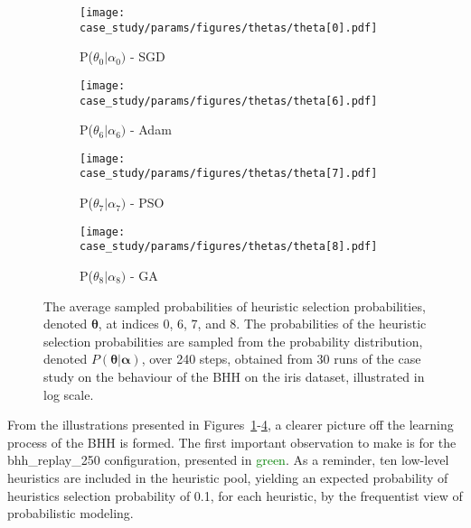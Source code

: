 \begin{figure}[htb]
	\begin{subfigure}{0.5\textwidth}
		\centering
		\texttt{[image: case\_study/params/figures/thetas/theta[0].pdf]}
		\caption{P($\theta_{0} \vert \alpha_{0})$ - \acs{SGD}}
		\label{fig:results:case_study:thetas:0}
	\end{subfigure}
	\begin{subfigure}{0.5\textwidth}
		\centering
		\texttt{[image: case\_study/params/figures/thetas/theta[6].pdf]}
		\caption{P($\theta_{6} \vert \alpha_{6})$ - \acs{Adam}}
		\label{fig:results:case_study:thetas:6}
	\end{subfigure}
	\par\bigskip
	\begin{subfigure}{0.5\textwidth}
		\centering
		\texttt{[image: case\_study/params/figures/thetas/theta[7].pdf]}
		\caption{P($\theta_{7} \vert \alpha_{7})$ - \acs{PSO}}
		\label{fig:results:case_study:thetas:7}
	\end{subfigure}
	\begin{subfigure}{0.5\textwidth}
		\centering
		\texttt{[image: case\_study/params/figures/thetas/theta[8].pdf]}
		\caption{P($\theta_{8} \vert \alpha_{8})$ - \acs{GA}}
		\label{fig:results:case_study:thetas:8}
	\end{subfigure}
	\par\bigskip
	\caption{The average sampled probabilities of heuristic selection probabilities, denoted $\boldsymbol{\theta}$, at indices 0, 6, 7, and 8. The probabilities of the heuristic selection probabilities are sampled from the probability distribution, denoted $P(\boldsymbol{\theta} \vert \boldsymbol{\alpha})$, over 240 steps, obtained from 30 runs of the case study on the behaviour of the \acs{BHH} on the iris dataset, illustrated in log scale.}
	\label{fig:results:case_study:thetas}
\end{figure}


From the illustrations presented in Figures~\ref{fig:results:case_study:thetas:0}-\ref{fig:results:case_study:thetas:8}, a clearer picture off the learning process of the \acs{BHH} is formed. The first important observation to make is for the bhh\_replay\_250 configuration, presented in \textcolor{green}{green}. As a reminder, ten low-level heuristics are included in the heuristic pool, yielding an expected probability of heuristics selection probability of 0.1, for each heuristic, by the frequentist view of probabilistic modeling.

